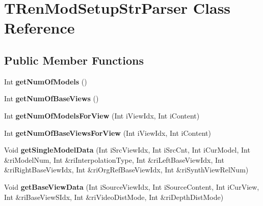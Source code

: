 \hypertarget{class_t_ren_mod_setup_str_parser}{}\section{T\+Ren\+Mod\+Setup\+Str\+Parser Class Reference}
\label{class_t_ren_mod_setup_str_parser}
\subsection*{Public Member Functions}
\begin{DoxyCompactItemize}
\item 
\mbox{\label{class_t_ren_mod_setup_str_parser_a15784bfab49811165eeab8bf506e4a46}} 
Int {\bfseries get\+Num\+Of\+Models} ()
\item 
\mbox{\label{class_t_ren_mod_setup_str_parser_a20cf764ee97d4c72f90ffbf0221e69bd}} 
Int {\bfseries get\+Num\+Of\+Base\+Views} ()
\item 
\mbox{\label{class_t_ren_mod_setup_str_parser_ab5450f49aa7b23973abd20903209ecf6}} 
Int {\bfseries get\+Num\+Of\+Models\+For\+View} (Int i\+View\+Idx, Int i\+Content)
\item 
\mbox{\label{class_t_ren_mod_setup_str_parser_af5b6ddc89980e0e4456c40f69bd17949}} 
Int {\bfseries get\+Num\+Of\+Base\+Views\+For\+View} (Int i\+View\+Idx, Int i\+Content)
\item 
\mbox{\label{class_t_ren_mod_setup_str_parser_af89e60f2f72cfb9154e351b05be98a11}} 
Void {\bfseries get\+Single\+Model\+Data} (Int i\+Src\+View\+Idx, Int i\+Src\+Cnt, Int i\+Cur\+Model, Int \&ri\+Model\+Num, Int \&ri\+Interpolation\+Type, Int \&ri\+Left\+Base\+View\+Idx, Int \&ri\+Right\+Base\+View\+Idx, Int \&ri\+Org\+Ref\+Base\+View\+Idx, Int \&ri\+Synth\+View\+Rel\+Num)
\item 
\mbox{\label{class_t_ren_mod_setup_str_parser_aef68b2d6dbbdbc4b69a26d4958f74a89}} 
Void {\bfseries get\+Base\+View\+Data} (Int i\+Source\+View\+Idx, Int i\+Source\+Content, Int i\+Cur\+View, Int \&ri\+Base\+View\+S\+Idx, Int \&ri\+Video\+Dist\+Mode, Int \&ri\+Depth\+Dist\+Mode)

\end{DoxyCompactItemize}
